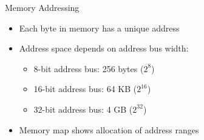 \begin{concept}{Memory Addressing}
\begin{itemize}
  \item Each byte in memory has a unique address
  \item Address space depends on address bus width:
    \begin{itemize}
      \item 8-bit address bus: 256 bytes ($2^8$)
      \item 16-bit address bus: 64 KB ($2^{16}$)
      \item 32-bit address bus: 4 GB ($2^{32}$)
    \end{itemize}
  \item Memory map shows allocation of address ranges
\end{itemize}
\end{concept}

